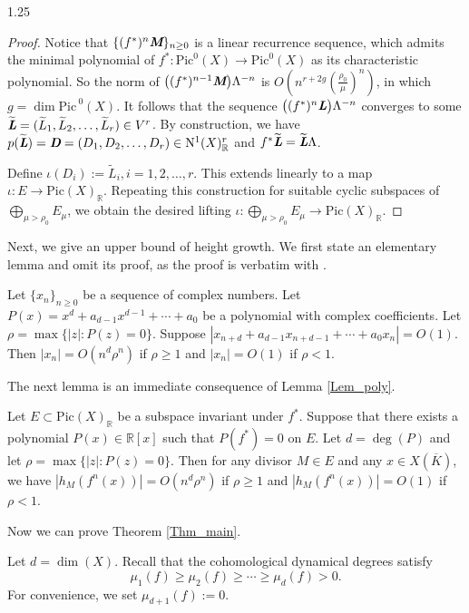 \documentclass[12pt]{amsart}
\newcommand{\mb}[1]{\mathbb{#1}}
\newcommand{\mr}[1]{\mathrm{#1}}
\newcommand{\ov}{\overline}
\newcommand\ra{\rightarrow}
\newcommand\wt{\widetilde}
\newcommand\Pic{\mathrm{Pic\,}}
\newcommand{\mib}[1]{\textit{\textbf{#1}}}
\begin{document}
\begin{spacing}{1.25}
\begin{proof}
Notice that $\{(f^*)^n\mib{M}\}_{n\geq0}$ is a linear recurrence sequence, which admits the minimal polynomial of $f^*:\mr{Pic}^0(X)\rightarrow\mr{Pic}^0(X)$ as its characteristic polynomial. So the norm of $\big((f^{*})^{n-1}\mib{M}\big)\Lambda^{-n}$ is $O(n^{r+2g}(\frac{\rho_0}{\mu})^n)$, in which $g=\dim\Pic^0(X)$. It follows that the sequence $\big((f^*)^n\mib{L}\big)\Lambda^{-n}$ converges to some $\wt{\mib{L}}=(\wt{L}_1,\wt{L}_2,\ldots,\wt{L}_r)\in V^{r}$. By construction, we have $p(\wt{\mib{L}})=\mib{D}=(D_1,D_2,\ldots,D_r)\in\mr{N}^1(X)_{\mb{R}}^{r}$ and $f^*\wt{\mib{L}}=\wt{\mib{L}}\Lambda$.

Define $\iota(D_i):=\wt{L}_i, i=1,2,\ldots,r$. This extends linearly to a map $\iota: E\ra \mr{Pic}(X)_{\mb{R}}$. Repeating this construction for suitable cyclic subspaces of $\bigoplus\limits_{\mu>\rho_0}E_{\mu}$, we obtain the desired lifting $\iota:\bigoplus\limits_{\mu>\rho_0}E_{\mu} \ra \mr{Pic}(X)_{\mb{R}}$.
\end{proof}

Next, we give an upper bound of height growth. We first state an elementary lemma and omit its proof, as the proof is verbatim with \cite[Lemma 3.2]{XY}.

\begin{lemma}\label{Lem_poly}
Let $\{x_n\}_{n\geq0}$ be a sequence of complex numbers. Let $P(x)=x^d+a_{d-1}x^{d-1}+\cdots+a_0$ be a polynomial with complex coefficients. Let $\rho=\max\{|z|:P(z)=0\}$. Suppose $|x_{n+d}+a_{d-1}x_{n+d-1}+\cdots+a_0x_n|=O(1)$. Then $|x_n|=O(n^d\rho^n)$ if $\rho\geq1$ and $|x_n|=O(1)$ if $\rho<1$.
\end{lemma}

The next lemma is an immediate consequence of Lemma \ref{Lem_poly}.

\begin{corollary}\label{Cor_htbd}
Let $E\subset \mr{Pic}(X)_{\mb{R}}$ be a subspace invariant under $f^*$. Suppose that there exists a polynomial $P(x)\in\mathbb{R}[x]$ such that $P(f^*)=0$ on $E$. Let $d=\deg(P)$ and let $\rho=\max\{|z|:P(z)=0\}$. Then for any divisor $M\in E$ and any $x\in X(\ov{K})$, we have $|h_M(f^n(x))|=O(n^d\rho^n)$ if $\rho\geq1$ and $|h_M(f^n(x))|=O(1)$ if $\rho<1$.    
\end{corollary}
Now we can prove Theorem \ref{Thm_main}.

Let $d=\dim(X)$. Recall that the cohomological dynamical degrees satisfy
\[\mu_1(f)\geq \mu_2(f)\geq \cdots\geq \mu_d(f)>0.\]
For convenience, we set $\mu_{d+1}(f):=0$.


\end{spacing}
\end{document}
